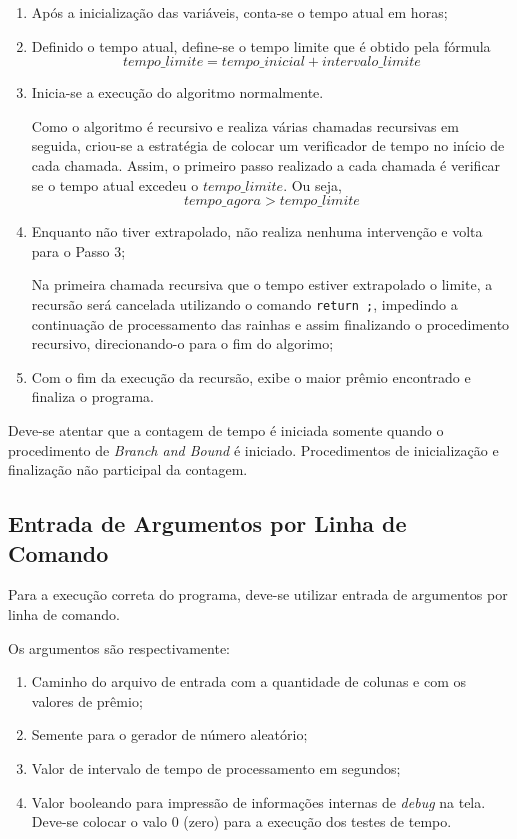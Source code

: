 \documentclass[12pt]{article}
\begin{document}
	\begin{enumerate}
		\item Após a inicialização das variáveis, conta-se o tempo atual em horas;

		\item Definido o tempo atual, define-se o tempo limite que é obtido pela fórmula $$ tempo\_limite = tempo\_inicial + intervalo\_limite $$

		\item Inicia-se a execução do algoritmo normalmente.

		Como o algoritmo é recursivo e realiza várias chamadas recursivas em seguida, criou-se a estratégia de colocar um verificador de tempo no início de cada chamada. Assim, o primeiro passo realizado a cada chamada é verificar se o tempo atual excedeu o $ tempo\_limite $. Ou seja, $$ tempo\_agora > tempo\_limite $$

		\item Enquanto não tiver extrapolado, não realiza nenhuma intervenção e volta para o Passo 3;

		Na primeira chamada recursiva que o tempo estiver extrapolado o limite, a recursão será cancelada utilizando o comando \verb|return ;|, impedindo a continuação de processamento das rainhas e assim finalizando o procedimento recursivo, direcionando-o para o fim do algorimo;

		\item Com o fim da execução da recursão, exibe o maior prêmio encontrado e finaliza o programa.
	\end{enumerate}

		Deve-se atentar que a contagem de tempo é iniciada somente quando o procedimento de \textit{Branch and Bound} é iniciado. Procedimentos de inicialização e finalização não participal da contagem.

	\subsection{Entrada de Argumentos por Linha de Comando} \label{sec:linhaDeComando}
		Para a execução correta do programa, deve-se utilizar entrada de argumentos por linha de comando.

		Os argumentos são respectivamente:
		\begin{enumerate}
			\item Caminho do arquivo de entrada com a quantidade de colunas e com os valores de prêmio;

			\item Semente para o gerador de número aleatório;

			\item Valor de intervalo de tempo de processamento em segundos;

			\item Valor booleando para impressão de informações internas de \textit{debug} na tela. Deve-se colocar o valo 0 (zero) para a execução dos testes de tempo.
		\end{enumerate}
\end{document}
